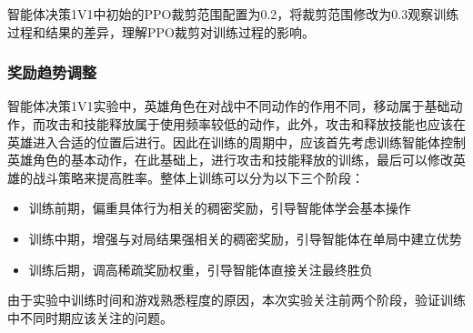 智能体决策1V1中初始的PPO裁剪范围配置为0.2，将裁剪范围修改为0.3观察训练过程和结果的差异，理解PPO裁剪对训练过程的影响。

\subsubsection{奖励趋势调整}
智能体决策1V1实验中，英雄角色在对战中不同动作的作用不同，移动属于基础动作，而攻击和技能释放属于使用频率较低的动作，此外，攻击和释放技能也应该在英雄进入合适的位置后进行。因此在训练的周期中，应该首先考虑训练智能体控制英雄角色的基本动作，在此基础上，进行攻击和技能释放的训练，最后可以修改英雄的战斗策略来提高胜率。整体上训练可以分为以下三个阶段：
\begin{itemize}
    \item 训练前期，偏重具体行为相关的稠密奖励，引导智能体学会基本操作
    \item 训练中期，增强与对局结果强相关的稠密奖励，引导智能体在单局中建立优势
    \item 训练后期，调高稀疏奖励权重，引导智能体直接关注最终胜负
\end{itemize}

由于实验中训练时间和游戏熟悉程度的原因，本次实验关注前两个阶段，验证训练中不同时期应该关注的问题。